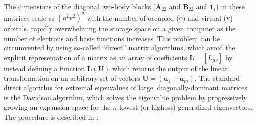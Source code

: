 The dimensions of the diagonal two-body blocks (\(\mathbf{A}_{22}\) and
\(\mathbf{B}_{22}\) and \(\mathbf{1}_s\)) in these matrices scale as
\((\mathrm{o}^2\mathrm{v}^2)^2\) with the number of occupied (\(\mathrm{o}\))
and virtual (\(\mathrm{v}\)) orbitals, rapidly overwhelming the storage space on
a given computer as the number of electrons and basis functions increases.
This problem can be circumvented by using so-called ``direct'' matrix
algorithms, which avoid the explicit representation of a matrix as an array of
coefficients \(\mathbf{L}=[L_{\mu\nu}]\) by instead defining a function
\(\mathbf{L}(\mathbf{U})\) which returns the output of the linear transformation
on an arbitrary set of vectors \(\mathbf{U}=(\mathbf{u}_1\ \cdots\
\mathbf{u}_m)\).
The standard direct algorithm for extremal eigenvalues of large,
diagonally-dominant matrices is the Davidson
algorithm,\cite{Davidson:1975p87,Liu:1978p49} which solves the eigenvalue
problem by progressively growing an expansion space for the \(n\) lowest (or
highest) generalized eigenvectors.
The procedure is described in .

